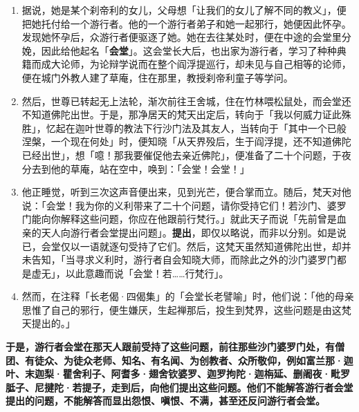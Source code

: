 \begin{enumerate}
\item 据说，她是某个刹帝利的女儿，父母想「让我们的女儿了解不同的教义」，便把她托付给一个游行者。他的一个游行者弟子和她一起邪行，她便因此怀孕。发现她怀孕后，众游行者便驱逐了她。她在去往某处时，便在中途的会堂里分娩，因此给他起名「\textbf{会堂}」。这会堂长大后，也出家为游行者，学习了种种典籍而成大论师，为论辩学说而在整个阎浮提巡行，却未见与自己相等的论师，便在城门外教人建了草庵，住在那里，教授刹帝利童子等学问。
\item 然后，世尊已转起无上法轮，渐次前往王舍城，住在竹林喂松鼠处，而会堂还不知道佛陀出世。于是，那净居天的梵天出定后，转向于「我以何威力证此殊胜」，忆起在迦叶世尊的教法下行沙门法及其友人，当转向于「其中一个已般涅槃，一个现在何处」时，便知晓「从天界殁后，生于阎浮提，还不知道佛陀已经出世」，想「噫！那我要催促他去亲近佛陀」，便准备了二十个问题，于夜分去到他的草庵，站在空中，唤到：「会堂！会堂！」
\item 他正睡觉，听到三次这声音便出来，见到光芒，便合掌而立。随后，梵天对他说：「会堂！我为你的义利带来了二十个问题，请你受持它们！若沙门、婆罗门能向你解释这些问题，你应在他跟前行梵行。」就此天子而说「先前曾是血亲的天人向游行者会堂提出问题」。\textbf{提出}，即仅以略说，而非以分别。如是说已，会堂仅以一语就逐句受持了它们。然后，这梵天虽然知道佛陀出世，却并未告知，「当寻求义利时，游行者自会知晓大师，而除此之外的沙门婆罗门都是虚无」，以此意趣而说「会堂！若……行梵行」。
\item 然而，在注释「长老偈·四偈集」的「会堂长老譬喻」时，他们说：「他的母亲思惟了自己的邪行，便生嫌厌，生起禅那后，投生到梵界，这些问题是由这梵天提出的。」\end{enumerate}

\textbf{于是，游行者会堂在那天人跟前受持了这些问题，前往那些沙门婆罗门处，有僧团、有徒众、为徒众老师、知名、有名闻、为创教者、众所敬仰，例如富兰那·迦叶、末迦梨·瞿舍利子、阿耆多·翅舍钦婆罗、迦罗拘陀·迦栴延、删阇夜·毗罗胝子、尼揵陀·若提子，走到后，向他们提出这些问题。他们不能解答游行者会堂提出的问题，不能解答而显出怨恨、嗔恨、不满，甚至还反问游行者会堂。}

